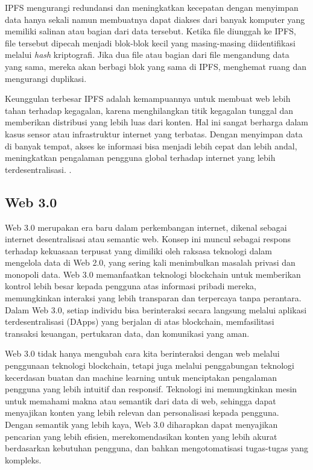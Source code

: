 IPFS mengurangi redundansi dan meningkatkan kecepatan dengan menyimpan data hanya sekali namun membuatnya dapat diakses dari banyak komputer yang memiliki salinan atau bagian dari data tersebut. Ketika file diunggah ke IPFS, file tersebut dipecah menjadi blok-blok kecil yang masing-masing diidentifikasi melalui \emph{hash} kriptografi. Jika dua file atau bagian dari file mengandung data yang sama, mereka akan berbagi blok yang sama di IPFS, menghemat ruang dan mengurangi duplikasi.

Keunggulan terbesar IPFS adalah kemampuannya untuk membuat web lebih tahan terhadap kegagalan, karena menghilangkan titik kegagalan tunggal dan memberikan distribusi yang lebih luas dari konten. Hal ini sangat berharga dalam kasus sensor atau infrastruktur internet yang terbatas. Dengan menyimpan data di banyak tempat, akses ke informasi bisa menjadi lebih cepat dan lebih andal, meningkatkan pengalaman pengguna global terhadap internet yang lebih terdesentralisasi. \cite{Steichen18}.

\subsection{Web 3.0}
Web 3.0 merupakan era baru dalam perkembangan internet, dikenal sebagai internet desentralisasi atau semantic web. Konsep ini muncul sebagai respons terhadap kekuasaan terpusat yang dimiliki oleh raksasa teknologi dalam mengelola data di Web 2.0, yang sering kali menimbulkan masalah privasi dan monopoli data. Web 3.0 memanfaatkan teknologi blockchain untuk memberikan kontrol lebih besar kepada pengguna atas informasi pribadi mereka, memungkinkan interaksi yang lebih transparan dan terpercaya tanpa perantara. Dalam Web 3.0, setiap individu bisa berinteraksi secara langsung melalui aplikasi terdesentralisasi (DApps) yang berjalan di atas blockchain, memfasilitasi transaksi keuangan, pertukaran data, dan komunikasi yang aman. \cite{RAY2023213}

Web 3.0 tidak hanya mengubah cara kita berinteraksi dengan web melalui penggunaan teknologi blockchain, tetapi juga melalui penggabungan teknologi kecerdasan buatan dan machine learning untuk menciptakan pengalaman pengguna yang lebih intuitif dan responsif. Teknologi ini memungkinkan mesin untuk memahami makna atau semantik dari data di web, sehingga dapat menyajikan konten yang lebih relevan dan personalisasi kepada pengguna. Dengan semantik yang lebih kaya, Web 3.0 diharapkan dapat menyajikan pencarian yang lebih efisien, merekomendasikan konten yang lebih akurat berdasarkan kebutuhan pengguna, dan bahkan mengotomatisasi tugas-tugas yang kompleks. \cite{Chohan2022}

